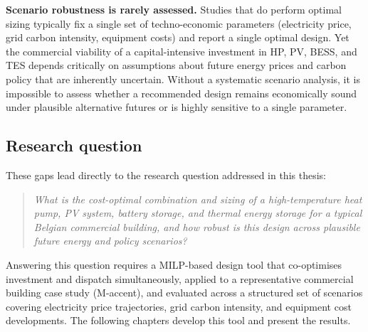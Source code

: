 \documentclass[11pt,a4paper]{report}
\begin{document}
\textbf{Scenario robustness is rarely assessed.}
Studies that do perform optimal sizing typically fix a single set of techno-economic parameters (electricity price, grid carbon intensity, equipment costs) and report a single optimal design.
Yet the commercial viability of a capital-intensive investment in HP, PV, BESS, and TES depends critically on assumptions about future energy prices and carbon policy that are inherently uncertain.
Without a systematic scenario analysis, it is impossible to assess whether a recommended design remains economically sound under plausible alternative futures or is highly sensitive to a single parameter.

\subsection*{Research question}

These gaps lead directly to the research question addressed in this thesis:

\begin{quote}
\textit{What is the cost-optimal combination and sizing of a high-temperature heat pump, PV system, battery storage, and thermal energy storage for a typical Belgian commercial building, and how robust is this design across plausible future energy and policy scenarios?}
\end{quote}

Answering this question requires a MILP-based design tool that co-optimises investment and dispatch simultaneously, applied to a representative commercial building case study (M-accent), and evaluated across a structured set of scenarios covering electricity price trajectories, grid carbon intensity, and equipment cost developments.
The following chapters develop this tool and present the results.





\end{document}
